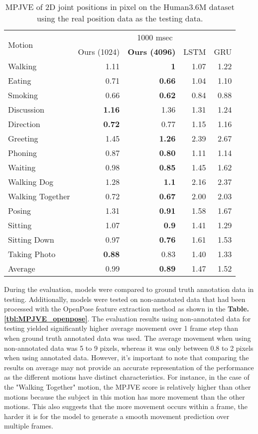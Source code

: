 \begin{table}
    \centering
    \caption{MPJVE of 2D joint positions in pixel on the Human3.6M dataset using the real position data as the testing data.}
    \begin{tabular}{l|rrrr}
        \toprule
        \multirow{2}{*}{Motion}                            & \multicolumn{4}{c}{1000 msec} \\
            & Ours (1024) & \textbf{Ours (4096)} & LSTM & GRU \\
        \midrule
        Walking	&	1.11	&	\textbf{1}	&	1.07	&	1.22 \\
Eating	&	0.71	&	\textbf{0.66}	&	1.04	&	1.10 \\
Smoking	&	0.66	&	\textbf{0.62}	&	0.84	&	0.88 \\
Discussion	&	\textbf{1.16}	&	1.36	&	1.31	&	1.24 \\
Direction	&	\textbf{0.72}	&	0.77	&	1.15	&	1.16 \\
Greeting	&	1.45	&	\textbf{1.26}	&	2.39	&	2.67 \\
Phoning	&	0.87	&	\textbf{0.80}	&	1.11	&	1.14 \\
Waiting	&	0.98	&	\textbf{0.85}	&	1.45	&	1.62 \\
Walking Dog	&	1.28	&	\textbf{1.1}	&	2.16	&	2.37 \\
Walking Together	&	0.72	&	\textbf{0.67}	&	2.00	&	2.03 \\
Posing	&	1.31	&	\textbf{0.91}	&	1.58	&	1.67 \\
Sitting	&	1.07	&	\textbf{0.9}	&	1.41	&	1.29 \\
Sitting Down	&	0.97	&	\textbf{0.76}	&	1.61	&	1.53 \\
Taking Photo	&	\textbf{0.88}	&	0.83	&	1.40	&	1.33 \\
        \midrule
        Average	&	0.99	&	\textbf{0.89}	&	1.47	&	1.52\\
        \bottomrule
    \end{tabular}
    \label{tbl:2DMPJVE_gt_long}
\end{table}

During the evaluation, models were compared to ground truth annotation data in testing. Additionally, models were tested on non-annotated data that had been processed with the OpenPose feature extraction method as shown in the \textbf{Table. \ref{tbl:MPJVE_openpose}}. The evaluation results using non-annotated data for testing yielded significantly higher average movement over 1 frame step than when ground truth annotated data was used. The average movement when using non-annotated data was 5 to 9 pixels, whereas it was only between 0.8 to 2 pixels when using annotated data. However, it's important to note that comparing the results on average may not provide an accurate representation of the performance as the different motions have distinct characteristics. For instance, in the case of the "Walking Together" motion, the MPJVE score is relatively higher than other motions because the subject in this motion has more movement than the other motions. This also suggests that the more movement occurs within a frame, the harder it is for the model to generate a smooth movement prediction over multiple frames.

